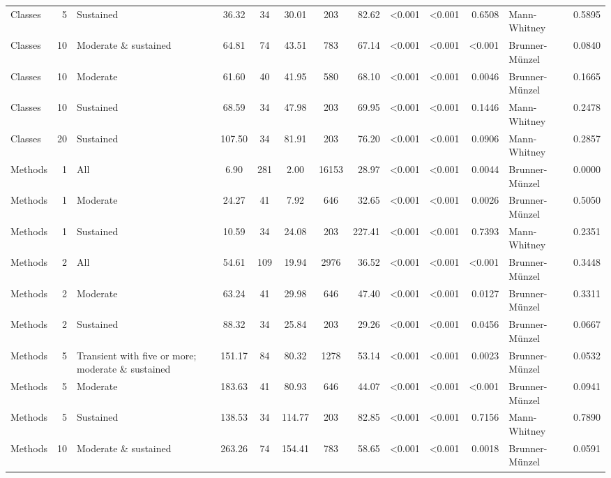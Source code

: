 \begin{table}[H]
{\begin{tabular}{l r p{4cm} c c c c r r r r l r}
Classes & 5 & Sustained &  36.32 & 34 & 30.01 & 203 & 82.62 & \textless 0.001 & \textless 0.001 & 0.6508 &  Mann-Whitney & 0.5895 \\ 
Classes & 10 & Moderate \& sustained &  64.81 & 74 & 43.51 & 783 & 67.14 & \textless 0.001 & \textless 0.001 & \textless 0.001 &  Brunner-Münzel & 0.0840 \\ 
Classes & 10 & Moderate &  61.60 & 40 & 41.95 & 580 & 68.10 & \textless 0.001 & \textless 0.001 & 0.0046 &  Brunner-Münzel & 0.1665 \\ 
Classes & 10 & Sustained &  68.59 & 34 & 47.98 & 203 & 69.95 & \textless 0.001 & \textless 0.001 & 0.1446 &  Mann-Whitney & 0.2478 \\ 
Classes & 20 & Sustained &  107.50 & 34 & 81.91 & 203 & 76.20 & \textless 0.001 & \textless 0.001 & 0.0906 &  Mann-Whitney & 0.2857 \\ 
Methods & 1 & All &  6.90 & 281 & 2.00 & 16153 & 28.97 & \textless 0.001 & \textless 0.001 & 0.0044 &  Brunner-Münzel & 0.0000 \\ 
Methods & 1 & Moderate &  24.27 & 41 & 7.92 & 646 & 32.65 & \textless 0.001 & \textless 0.001 & 0.0026 &  Brunner-Münzel & 0.5050 \\ 
Methods & 1 & Sustained &  10.59 & 34 & 24.08 & 203 & 227.41 & \textless 0.001 & \textless 0.001 & 0.7393 &  Mann-Whitney & 0.2351 \\ 
Methods & 2 & All &  54.61 & 109 & 19.94 & 2976 & 36.52 & \textless 0.001 & \textless 0.001 & \textless 0.001 &  Brunner-Münzel & 0.3448 \\ 
Methods & 2 & Moderate &  63.24 & 41 & 29.98 & 646 & 47.40 & \textless 0.001 & \textless 0.001 & 0.0127 &  Brunner-Münzel & 0.3311 \\ 
Methods & 2 & Sustained &  88.32 & 34 & 25.84 & 203 & 29.26 & \textless 0.001 & \textless 0.001 & 0.0456 &  Brunner-Münzel & 0.0667 \\ 
Methods & 5 & Transient with five or more; moderate \& sustained &  151.17 & 84 & 80.32 & 1278 & 53.14 & \textless 0.001 & \textless 0.001 & 0.0023 &  Brunner-Münzel & 0.0532 \\ 
Methods & 5 & Moderate &  183.63 & 41 & 80.93 & 646 & 44.07 & \textless 0.001 & \textless 0.001 & \textless 0.001 &  Brunner-Münzel & 0.0941 \\ 
Methods & 5 & Sustained &  138.53 & 34 & 114.77 & 203 & 82.85 & \textless 0.001 & \textless 0.001 & 0.7156 &  Mann-Whitney & 0.7890 \\ 
Methods & 10 & Moderate \& sustained &  263.26 & 74 & 154.41 & 783 & 58.65 & \textless 0.001 & \textless 0.001 & 0.0018 &  Brunner-Münzel & 0.0591 \\ 

\end{tabular}}
\end{table}
